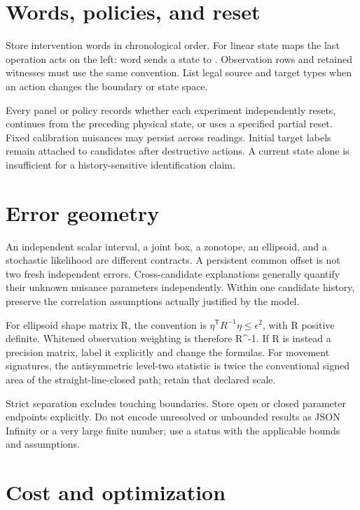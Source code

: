 \documentclass[
  11pt,
  a4paper,
]{report}
\let\nxtexttt\texttt
\renewcommand{\texttt}[1]{\nxtexttt{\seqsplit{#1}}}
\begin{document}
\hypertarget{words-policies-and-reset}{%
\section{Words, policies, and reset}\label{words-policies-and-reset}}

Store intervention words in chronological order. For linear state maps
the last operation acts on the left: word \texttt{{[}a,b{]}} sends a
state to \texttt{M\_b\ M\_a\ v}. Observation rows and retained witnesses
must use the same convention. List legal source and target types when an
action changes the boundary or state space.

Every panel or policy records whether each experiment independently
resets, continues from the preceding physical state, or uses a specified
partial reset. Fixed calibration nuisances may persist across readings.
Initial target labels remain attached to candidates after destructive
actions. A current state alone is insufficient for a history-sensitive
identification claim.

\hypertarget{error-geometry}{%
\section{Error geometry}\label{error-geometry}}

An independent scalar interval, a joint box, a zonotope, an ellipsoid,
and a stochastic likelihood are different contracts. A persistent common
offset is not two fresh independent errors. Cross-candidate explanations
generally quantify their unknown nuisance parameters independently.
Within one candidate history, preserve the correlation assumptions
actually justified by the model.

For ellipsoid shape matrix R, the convention is
\(\eta^{\mathsf T} R^{-1} \eta \le \epsilon^{2}\), with R positive
definite. Whitened observation weighting is therefore R\^{}-1. If R is
instead a precision matrix, label it explicitly and change the formulas.
For movement signatures, the antisymmetric level-two statistic is twice
the conventional signed area of the straight-line-closed path; retain
that declared scale.

Strict separation excludes touching boundaries. Store open or closed
parameter endpoints explicitly. Do not encode unresolved or unbounded
results as JSON Infinity or a very large finite number; use a status
with the applicable bounds and assumptions.

\hypertarget{cost-and-optimization}{%
\section{Cost and optimization}\label{cost-and-optimization}}
\end{document}
